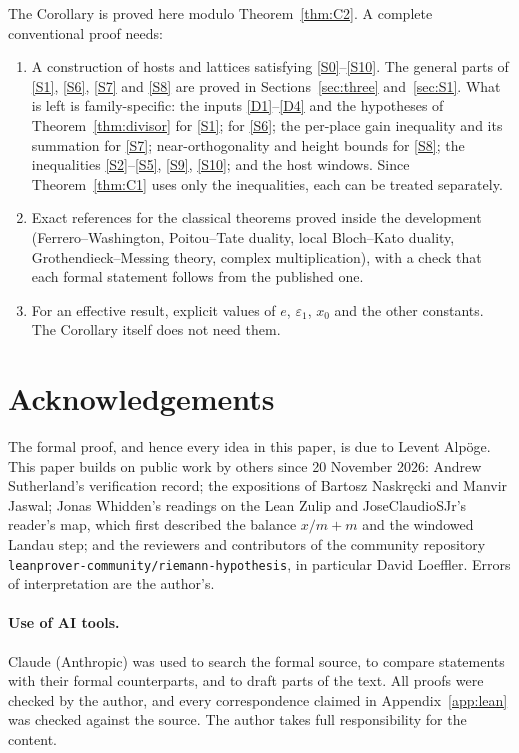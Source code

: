 \documentclass[11pt]{amsart}
\newcommand{\eps}{\varepsilon}
\theoremstyle{plain}
\theoremstyle{definition}
\numberwithin{equation}{section}
\begin{document}
The Corollary is proved here modulo Theorem~\ref{thm:C2}. A complete conventional proof
needs:
\begin{enumerate}
\item A construction of hosts and lattices satisfying \ref{S0}--\ref{S10}. The general parts of
  \ref{S1}, \ref{S6}, \ref{S7} and \ref{S8} are proved in Sections~\ref{sec:three}
  and~\ref{sec:S1}. What is left is family-specific: the inputs \ref{D1}--\ref{D4} and the
  hypotheses of Theorem~\ref{thm:divisor} for \ref{S1};  for \ref{S6}; the per-place
  gain inequality and its summation for \ref{S7}; near-orthogonality and height bounds for
  \ref{S8}; the inequalities \ref{S2}--\ref{S5}, \ref{S9}, \ref{S10}; and the host windows. Since
  Theorem~\ref{thm:C1} uses only the inequalities, each can be treated separately.
\item Exact references for the classical theorems proved inside the development
  (Ferrero--Washington, Poitou--Tate duality, local Bloch--Kato duality, Grothendieck--Messing
  theory, complex multiplication), with a check that each formal statement follows from the
  published one.
\item For an effective result, explicit values of $e$, $\eps_1$, $x_0$ and the other constants. The
  Corollary itself does not need them.
\end{enumerate}

\section*{Acknowledgements}

The formal proof, and hence every idea in this paper, is due to Levent Alp\"oge. This paper builds
on public work by others since 20 November 2026: Andrew Sutherland's verification record; the
expositions of Bartosz Naskr\k{e}cki and Manvir Jaswal; Jonas Whidden's readings on the Lean Zulip
and JoseClaudioSJr's reader's map, which first described the balance $x/m+m$ and the windowed
Landau step; and the reviewers and contributors of the community repository
\texttt{leanprover-community/riemann-hypothesis}, in particular David Loeffler. Errors of
interpretation are the author's.

\paragraph{Use of AI tools.} Claude (Anthropic) was used to search the formal source, to compare
statements with their formal counterparts, and to draft parts of the text. All proofs were checked
by the author, and every correspondence claimed in Appendix~\ref{app:lean} was checked against the
source. The author takes full responsibility for the content.
\end{document}
